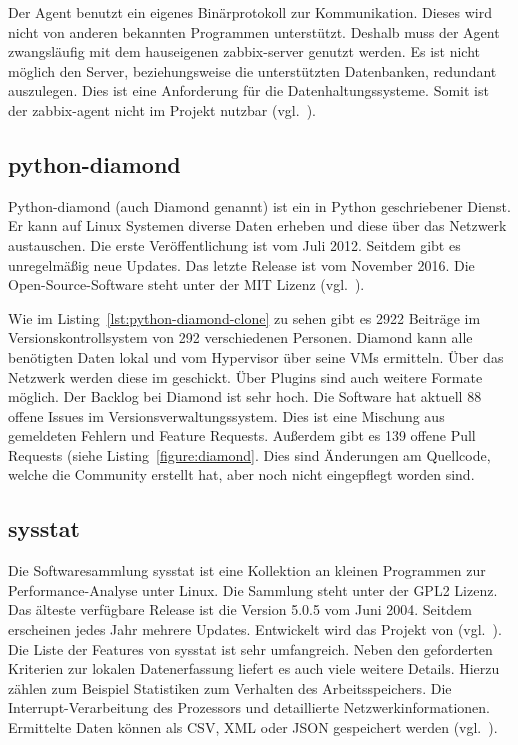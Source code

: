 Der Agent benutzt ein eigenes Binärprotokoll zur Kommunikation. Dieses wird
nicht von anderen bekannten Programmen unterstützt. Deshalb muss der Agent
zwangsläufig mit dem hauseigenen zabbix\hyp{}server genutzt werden. Es ist
nicht möglich den Server, beziehungsweise die unterstützten Datenbanken,
redundant auszulegen. Dies ist eine Anforderung für die Datenhaltungssysteme.
Somit ist der zabbix\hyp{}agent nicht im Projekt nutzbar
(vgl.~\cite{zabbix_architecture}).
\tm%

\subsection{python-diamond}
Python\hyp{}diamond (auch Diamond genannt) ist ein in Python geschriebener
Dienst. Er kann auf Linux Systemen diverse Daten erheben und diese über das
Netzwerk austauschen. Die erste Veröffentlichung ist vom Juli 2012. Seitdem
gibt es unregelmäßig neue Updates. Das letzte Release ist vom November 2016.
Die Open\hyp{}Source\hyp{}Software steht unter der MIT Lizenz
(vgl.~\cite{python-diamond}).

Wie im Listing~\ref{lst:python-diamond-clone} zu sehen gibt es 2922 Beiträge im
Versionskontrollsystem von 292 verschiedenen Personen. Diamond kann alle
benötigten Daten lokal und vom \gls{Hypervisor} über seine VMs ermitteln. Über
das Netzwerk werden diese im  geschickt. Über
Plugins sind auch weitere Formate möglich. Der \gls{Backlog} bei Diamond ist
sehr hoch. Die Software hat aktuell 88 offene Issues im
Versionsverwaltungssystem. Dies ist eine Mischung aus gemeldeten Fehlern und
Feature Requests. Außerdem gibt es 139 offene Pull Requests (siehe
Listing~\ref{figure:diamond}. Dies sind Änderungen am Quellcode, welche die
Community erstellt hat, aber noch nicht eingepflegt worden sind.
\tm%

\subsection{sysstat}
Die Softwaresammlung sysstat ist eine Kollektion an kleinen Programmen zur
Performance\hyp{}Analyse unter Linux. Die Sammlung steht unter der GPL2 Lizenz.
Das älteste verfügbare Release ist die Version 5.0.5 vom Juni 2004. Seitdem
erscheinen jedes Jahr mehrere Updates. Entwickelt wird das Projekt
von (vgl.~\cite{systat_releases}). Die Liste der Features von sysstat ist sehr
umfangreich. Neben den geforderten Kriterien zur lokalen Datenerfassung
liefert es auch viele weitere Details. Hierzu zählen zum Beispiel Statistiken
zum Verhalten des Arbeitsspeichers. Die \gls{Interrupt}\hyp{}Verarbeitung des
Prozessors und detaillierte Netzwerkinformationen. Ermittelte Daten können als
\gls{CSV}, \gls{XML} oder \gls{JSON} gespeichert werden
(vgl.~\cite{sysstat_features}).

